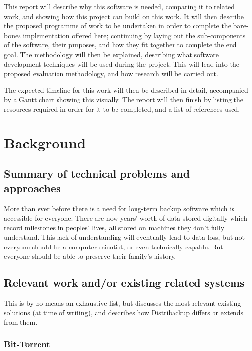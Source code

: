 \documentclass[12pt,a4paper,]{adreport}
\begin{document}
This report will describe why this software is needed, comparing it to
related work, and showing how this project can build on this work. It
will then describe the proposed programme of work to be undertaken in
order to complete the bare-bones implementation offered here; continuing
by laying out the sub-components of the software, their purposes, and
how they fit together to complete the end goal. The methodology will
then be explained, describing what software development techniques will
be used during the project. This will lead into the proposed evaluation
methodology, and how research will be carried out.

The expected timeline for this work will then be described in detail,
accompanied by a Gantt chart showing this visually. The report will then
finish by listing the resources required in order for it to be
completed, and a list of references used.

\chapter{Background}\label{background}

\section{Summary of technical problems and
approaches}\label{summary-of-technical-problems-and-approaches}

More than ever before there is a need for long-term backup software
which is accessible for everyone. There are now years' worth of data
stored digitally which record milestones in peoples' lives, all stored
on machines they don't fully understand. This lack of understanding will
eventually lead to data loss, but not everyone should be a computer
scientist, or even technically capable. But everyone should be able to
preserve their family's history.

\section{Relevant work and/or existing related
systems}\label{relevant-work-andor-existing-related-systems}

This is by no means an exhaustive list, but discusses the most relevant
existing solutions (at time of writing), and describes how Distribackup
differs or extends from them.

\subsection{Bit-Torrent}\label{bit-torrent}
\end{document}
